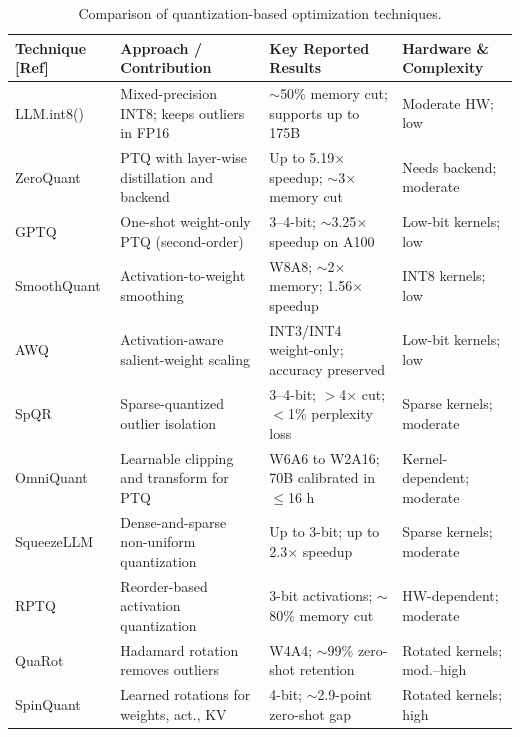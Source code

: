 \begin{table}[htbp]
\centering
\scriptsize
\caption{Comparison of quantization-based optimization techniques.}
\label{tab:lr-quant}
\renewcommand{\arraystretch}{1.2}
\begin{tabular}{p{}p{}p{}p{}}
\hline
\textbf{Technique [Ref]} & \textbf{Approach / Contribution} & \textbf{Key Reported Results} & \textbf{Hardware \& Complexity} \\
\hline
LLM.int8() \cite{dettmers2022llmint8} & Mixed-precision INT8; keeps outliers in FP16 & $\sim$50\% memory cut; supports up to 175B & Moderate HW; low \\
ZeroQuant \cite{yao2022zeroquant} & PTQ with layer-wise distillation and backend & Up to 5.19$\times$ speedup; $\sim$3$\times$ memory cut & Needs backend; moderate \\
GPTQ \cite{frantar2023gptq} & One-shot weight-only PTQ (second-order) & 3--4-bit; $\sim$3.25$\times$ speedup on A100 & Low-bit kernels; low \\
SmoothQuant \cite{xiao2023smoothquant} & Activation-to-weight smoothing & W8A8; $\sim$2$\times$ memory; 1.56$\times$ speedup & INT8 kernels; low \\
AWQ \cite{lin2024awq} & Activation-aware salient-weight scaling & INT3/INT4 weight-only; accuracy preserved & Low-bit kernels; low \\
SpQR \cite{dettmers2024spqr} & Sparse-quantized outlier isolation & 3--4-bit; $>$4$\times$ cut; $<$1\% perplexity loss & Sparse kernels; moderate \\
OmniQuant \cite{shao2024omniquant} & Learnable clipping and transform for PTQ & W6A6 to W2A16; 70B calibrated in $\leq$16 h & Kernel-dependent; moderate \\
SqueezeLLM \cite{kim2024squeezellm} & Dense-and-sparse non-uniform quantization & Up to 3-bit; up to 2.3$\times$ speedup & Sparse kernels; moderate \\
RPTQ \cite{yuan2023rptq} & Reorder-based activation quantization & 3-bit activations; $\sim$80\% memory cut & HW-dependent; moderate \\
QuaRot \cite{ashkboos2024quarot} & Hadamard rotation removes outliers & W4A4; $\sim$99\% zero-shot retention & Rotated kernels; mod.--high \\
SpinQuant \cite{liu2025spinquant} & Learned rotations for weights, act., KV & 4-bit; $\sim$2.9-point zero-shot gap & Rotated kernels; high \\

\end{tabular}
\end{table}
